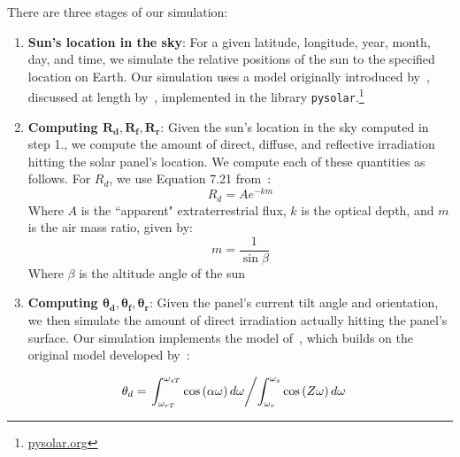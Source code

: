 \documentclass[11pt]{article}
\begin{document}
There are three stages of our simulation:
\begin{enumerate}
\item {\bf Sun's location in the sky}: For a given latitude, longitude, year, month, day, and time, we simulate the relative positions of the sun to the specified location on Earth. Our simulation uses a model originally introduced by~\citet{jordan1958chafer}, discussed at length by~\citet{masters2013renewable}, implemented in the library \texttt{pysolar}.\footnote{\url{pysolar.org}}

\item {\bf Computing $\pmb{R_d, R_f, R_r}$}: Given the sun's location in the sky computed in step 1., we compute the amount of direct, diffuse, and reflective irradiation hitting the solar panel's location. We compute each of these quantities as follows. For $R_d$, we use Equation 7.21 from~\citet{masters2013renewable}:
\begin{equation}
R_d = A e^{-km}
\end{equation}
Where $A$ is the ``apparent" extraterrestrial flux, $k$ is the optical depth, and $m$ is the air mass ratio, given by:
\begin{equation}
m = \frac{1}{\sin \beta}
\end{equation}
Where $\beta$ is the altitude angle of the sun

\item {\bf Computing $\pmb{\theta_d, \theta_f, \theta_r}$}: Given the panel's current tilt angle and orientation, we then simulate the amount of direct irradiation actually hitting the panel's surface. Our simulation implements the model of~\citet{andersen1980comments}, which builds on the original model developed by~\citet{klein1977calculation}:

\begin{align*}
\theta_d &= \left. \int_{\omega_{rT}}^{\omega_{sT}} \cos \left(\alpha \omega\right) d \omega \middle/ \int_{\omega_{r}}^{\omega_{s}} \cos \left(Z \omega\right) d \omega \right.
\end{align*}


\end{enumerate}
\end{document}
